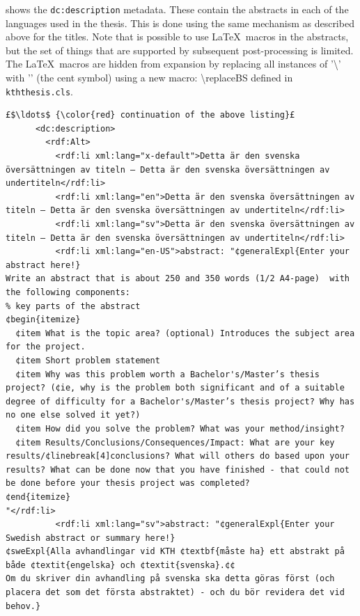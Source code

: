  shows the \texttt{dc:description} metadata. These contain the abstracts in each of the languages used in the thesis. This is done using the same mechanism as described above for the titles. Note that is possible to use \LaTeX~macros in the abstracts, but the set of things that are supported by subsequent post-processing is limited. The \LaTeX~macros are hidden from expansion by replacing all instances of '\textbackslash' with '\textcent' (the cent symbol) using a new macro: \textbackslash replaceBS defined in \texttt{kththesis.cls}.
\begin{lstlisting}[style=myXML,
caption={The \texttt{dc:description} metadata embedded in a PDF file (some reformatting has been done to fit the text in the boarders)}, label={lst:pdfinfoOutputPart7}]
£$\ldots$ {\color{red} continuation of the above listing}£ 
      <dc:description>
        <rdf:Alt>
          <rdf:li xml:lang="x-default">Detta är den svenska översättningen av titeln – Detta är den svenska översättningen av undertiteln</rdf:li>
          <rdf:li xml:lang="en">Detta är den svenska översättningen av titeln – Detta är den svenska översättningen av undertiteln</rdf:li>
          <rdf:li xml:lang="sv">Detta är den svenska översättningen av titeln – Detta är den svenska översättningen av undertiteln</rdf:li>
          <rdf:li xml:lang="en-US">abstract: "¢generalExpl{Enter your abstract here!}
Write an abstract that is about 250 and 350 words (1/2 A4-page)  with the following components:
% key parts of the abstract
¢begin{itemize}
  ¢item What is the topic area? (optional) Introduces the subject area for the project.
  ¢item Short problem statement
  ¢item Why was this problem worth a Bachelor's/Master’s thesis project? (¢ie, why is the problem both significant and of a suitable degree of difficulty for a Bachelor's/Master’s thesis project? Why has no one else solved it yet?)
  ¢item How did you solve the problem? What was your method/insight?
  ¢item Results/Conclusions/Consequences/Impact: What are your key results/¢linebreak[4]conclusions? What will others do based upon your results? What can be done now that you have finished - that could not be done before your thesis project was completed?
¢end{itemize}
"</rdf:li>
          <rdf:li xml:lang="sv">abstract: "¢generalExpl{Enter your Swedish abstract or summary here!}
¢sweExpl{Alla avhandlingar vid KTH ¢textbf{måste ha} ett abstrakt på både ¢textit{engelska} och ¢textit{svenska}.¢¢
Om du skriver din avhandling på svenska ska detta göras först (och placera det som det första abstraktet) - och du bör revidera det vid behov.}


\end{lstlisting}
